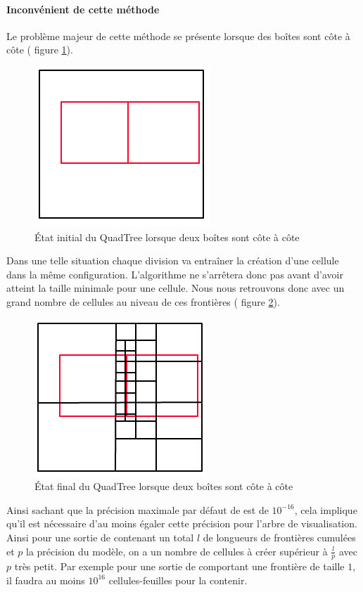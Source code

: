\paragraph{Inconvénient de cette méthode \label{para:qtInconv}}Le problème majeur de cette méthode se présente lorsque des boîtes sont côte à côte (\cf{} figure \ref{fig:frontiere}).
\begin{figure}[h!]
\centering
\includegraphics[scale=0.40]{img/QT10}
\caption{État initial du QuadTree lorsque deux boîtes sont côte à côte}
\label{fig:frontiere}
\end{figure}
Dans une telle situation chaque division va entraîner la création d'une cellule dans la même configuration. L'algorithme ne s'arrêtera donc pas avant d'avoir atteint la taille minimale pour une cellule. Nous nous retrouvons donc avec un grand nombre de cellules au niveau de ces \og frontières\fg{} (\cf{} figure \ref{fig:frontiere2}).
\begin{figure}[h!]
\centering
\includegraphics[scale=0.40]{img/QT11}
\caption{État final du QuadTree lorsque deux boîtes sont côte à côte}
\label{fig:frontiere2}
\end{figure}
Ainsi sachant que la précision maximale par défaut de \realpaver{} est de $10^{-16}$, cela implique qu'il est nécessaire d'au moins égaler cette précision pour l'arbre de visualisation. Ainsi pour une sortie de \realpaver{} contenant un total $l$ de longueurs de \og frontières \fg{}  cumulées et $p$ la précision du modèle, on a un nombre de cellules à créer supérieur à $\frac{l}{p}$ avec $p$ très petit. Par exemple pour une sortie de \realpaver{} comportant une \og frontière \fg{} de taille $1$, il faudra au moins $10^{16}$ cellules-feuilles pour la contenir. 

